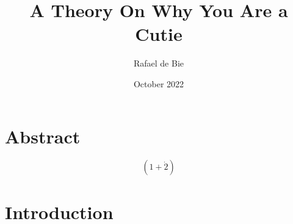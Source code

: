 \documentclass[12pt]{article}
\begin{document}
\title{A Theory On Why You Are a Cutie}
\author{Rafael de Bie}
\date{October 2022}
\maketitle

\section{Abstract}
$$ \left(1+\dot2\right) $$
\section{Introduction}
\end{document}

